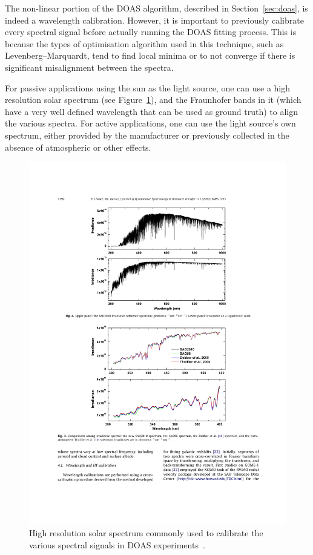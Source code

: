 The non-linear portion of the \gls{DOAS} algorithm, described in
Section~\ref{sec:doas}, is indeed a wavelength calibration. However, it
is important to previously calibrate every spectral signal before
actually running the \gls{DOAS} fitting process. This is because the
types of optimisation algorithm used in this technique, such as
Levenberg--Marquardt, tend to find local minima or to not converge if
there is significant misalignment between the spectra.

For passive applications using the sun as the light source, one can use
a high resolution solar spectrum (see Figure~\ref{fig:kurucz}), and the
Fraunhofer bands in it (which have a very well defined wavelength that
can be used as ground truth) to align the various spectra. For active
applications, one can use the light source's own spectrum, either
provided by the manufacturer or previously collected in the absence of
atmospheric or other effects.


\begin{figure}[htpb]
    \centering
    \includegraphics[clip,%
    trim=5.5cm 22cm 4.5cm 3.5cm,%
    width=\textwidth]{img/pdf/chance_kurucz.pdf}
    \caption{High resolution solar spectrum commonly used to calibrate
    the various spectral signals in \gls{DOAS}
    experiments~\cite{Chance2010}.}
    \label{fig:kurucz}
\end{figure}


